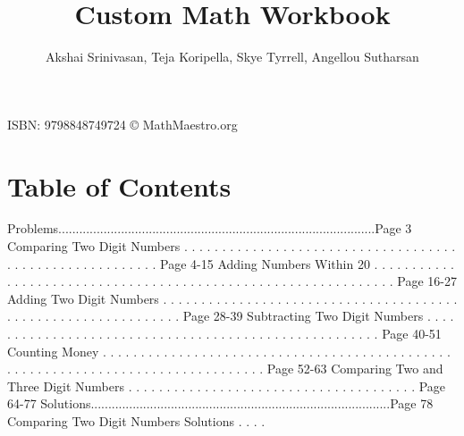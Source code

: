 \documentclass{article}%
\title{Custom Math Workbook}%
\author{Akshai Srinivasan, Teja Koripella, Skye Tyrrell, Angellou Sutharsan}%
\date{}%
\begin{document}
%
\normalsize%
\maketitle%
\vfill%
\begin{center}%
ISBN: 9798848749724%
\linebreak%
\copyright%
MathMaestro.org%
\end{center}%
\newpage%
\section{Table of Contents}%
\label{sec:TableofContents}%
Problems...........................................................................................Page 3%
\newline%
Comparing Two Digit Numbers%
.%
.%
.%
.%
.%
.%
.%
.%
.%
.%
.%
.%
.%
.%
.%
.%
.%
.%
.%
.%
.%
.%
.%
.%
.%
.%
.%
.%
.%
.%
.%
.%
.%
.%
.%
.%
.%
.%
.%
.%
.%
.%
.%
.%
.%
.%
.%
.%
.%
.%
.%
.%
.%
.%
.%
.%
Page 4{-}15%
\newline%
Adding Numbers Within 20%
.%
.%
.%
.%
.%
.%
.%
.%
.%
.%
.%
.%
.%
.%
.%
.%
.%
.%
.%
.%
.%
.%
.%
.%
.%
.%
.%
.%
.%
.%
.%
.%
.%
.%
.%
.%
.%
.%
.%
.%
.%
.%
.%
.%
.%
.%
.%
.%
.%
.%
.%
.%
.%
.%
.%
.%
.%
.%
.%
.%
.%
.%
Page 16{-}27%
\newline%
Adding Two Digit Numbers%
.%
.%
.%
.%
.%
.%
.%
.%
.%
.%
.%
.%
.%
.%
.%
.%
.%
.%
.%
.%
.%
.%
.%
.%
.%
.%
.%
.%
.%
.%
.%
.%
.%
.%
.%
.%
.%
.%
.%
.%
.%
.%
.%
.%
.%
.%
.%
.%
.%
.%
.%
.%
.%
.%
.%
.%
.%
.%
.%
.%
.%
.%
Page 28{-}39%
\newline%
Subtracting Two Digit Numbers%
.%
.%
.%
.%
.%
.%
.%
.%
.%
.%
.%
.%
.%
.%
.%
.%
.%
.%
.%
.%
.%
.%
.%
.%
.%
.%
.%
.%
.%
.%
.%
.%
.%
.%
.%
.%
.%
.%
.%
.%
.%
.%
.%
.%
.%
.%
.%
.%
.%
.%
.%
.%
.%
Page 40{-}51%
\newline%
Counting Money%
.%
.%
.%
.%
.%
.%
.%
.%
.%
.%
.%
.%
.%
.%
.%
.%
.%
.%
.%
.%
.%
.%
.%
.%
.%
.%
.%
.%
.%
.%
.%
.%
.%
.%
.%
.%
.%
.%
.%
.%
.%
.%
.%
.%
.%
.%
.%
.%
.%
.%
.%
.%
.%
.%
.%
.%
.%
.%
.%
.%
.%
.%
.%
.%
.%
.%
.%
.%
.%
.%
.%
.%
.%
.%
.%
.%
.%
.%
.%
.%
Page 52{-}63%
\newline%
Comparing Two and Three Digit Numbers%
.%
.%
.%
.%
.%
.%
.%
.%
.%
.%
.%
.%
.%
.%
.%
.%
.%
.%
.%
.%
.%
.%
.%
.%
.%
.%
.%
.%
.%
.%
.%
.%
.%
.%
.%
.%
.%
.%
Page 64{-}77%
\newline%
Solutions......................................................................................Page 78%
\newline%
Comparing Two Digit Numbers Solutions%
.%
.%
.%
.%
\end{document}
